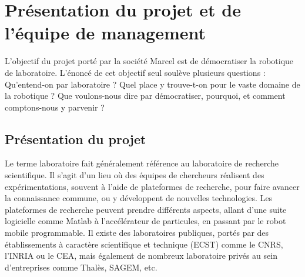 \documentclass[a4paper,12pt]{report}
\begin{document}




\section{Présentation du projet et de l'équipe de management}

L'objectif du projet porté par la société Marcel est de démocratiser la robotique de laboratoire.
L'énoncé de cet objectif seul soulève plusieurs questions : Qu'entend-on par laboratoire ? Quel place y trouve-t-on pour le vaste domaine de la robotique ?
Que voulons-nous dire par démocratiser, pourquoi, et comment comptons-nous y parvenir ?\\

\subsection{Présentation du projet}
Le terme laboratoire fait généralement référence au laboratoire de recherche scientifique.
Il s'agit d'un lieu où des équipes de chercheurs réalisent des expérimentations, souvent à l'aide de plateformes de recherche,
pour faire avancer la connaissance commune, ou y développent de nouvelles technologies.
Les plateformes de recherche peuvent prendre différents aspects, allant d'une suite logicielle comme Matlab à l'accélérateur de particules, en passant par le robot mobile programmable.
Il existe des laboratoires publiques, portés par des établissements à caractère scientifique et technique (ECST) comme le CNRS, l'INRIA ou le CEA, mais également de nombreux laboratoire privés au sein d'entreprises comme Thalès, SAGEM, etc.
\end{document}
